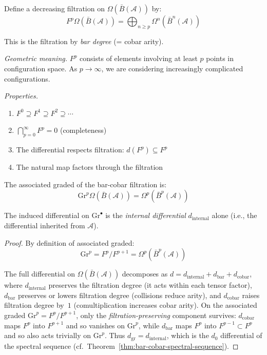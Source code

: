 \begin{definition}\label{def:bar-cobar-filtration}
Define a decreasing filtration on $\Omega(\bar{B}(\mathcal{A}))$ by:
\[F^p\Omega(\bar{B}(\mathcal{A})) = \bigoplus_{n \geq p} \Omega^n(\bar{B}^n(\mathcal{A}))\]

This is the filtration by \emph{bar degree} (= cobar arity).

\emph{Geometric meaning.} $F^p$ consists of elements involving at least $p$ points
in configuration space. As $p \to \infty$, we are considering increasingly complicated
configurations.

\emph{Properties.}
\begin{enumerate}
\item $F^0 \supseteq F^1 \supseteq F^2 \supseteq \cdots$
\item $\bigcap_{p=0}^\infty F^p = 0$ (completeness)
\item The differential respects filtration: $d(F^p) \subseteq F^p$
\item The natural map factors through the filtration
\end{enumerate}
\end{definition}

\begin{lemma}\label{lem:bar-cobar-associated-graded}
The associated graded of the bar-cobar filtration is:
\[\text{Gr}^p\Omega(\bar{B}(\mathcal{A})) = \Omega^p(\bar{B}^p(\mathcal{A}))\]

The induced differential on $\text{Gr}^\bullet$ is the \emph{internal differential} $d_{\text{internal}}$ alone (i.e., the differential inherited from $\mathcal{A}$).
\end{lemma}

\begin{proof}
By definition of associated graded:
\[\text{Gr}^p = F^p / F^{p+1} = \Omega^p(\bar{B}^p(\mathcal{A}))\]

The full differential on $\Omega(\bar{B}(\mathcal{A}))$ decomposes as $d = d_{\text{internal}} + d_{\text{bar}} + d_{\text{cobar}}$, where $d_{\text{internal}}$ preserves the filtration degree (it acts within each tensor factor), $d_{\text{bar}}$ preserves or lowers filtration degree (collisions reduce arity), and $d_{\text{cobar}}$ raises filtration degree by~$1$ (comultiplication increases cobar arity).  On the associated graded $\text{Gr}^p = F^p/F^{p+1}$, only the \emph{filtration-preserving} component survives: $d_{\text{cobar}}$ maps $F^p$ into $F^{p+1}$ and so vanishes on $\text{Gr}^p$, while $d_{\text{bar}}$ maps $F^p$ into $F^{p-1} \subset F^p$ and so also acts trivially on $\text{Gr}^p$.  Thus $d_{\text{gr}} = d_{\text{internal}}$, which is the $d_0$ differential of the spectral sequence (cf.\ Theorem~\ref{thm:bar-cobar-spectral-sequence}).
\end{proof}

